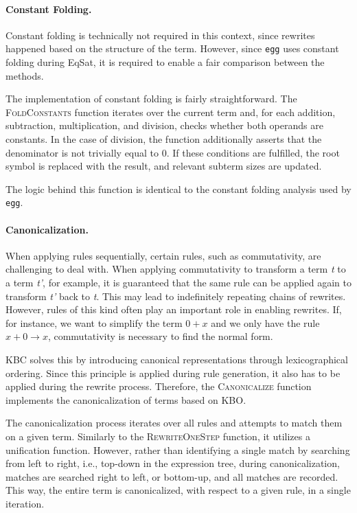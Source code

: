 \paragraph{Constant Folding.} Constant folding is technically not required in this context, since rewrites happened based on the structure of the term. However, since \texttt{egg} uses constant folding during EqSat, it is required to enable a fair comparison between the methods. 

The implementation of constant folding is fairly straightforward. The \textsc{FoldConstants} function iterates over the current term and, for each addition, subtraction, multiplication, and division, checks whether both operands are constants. In the case of division, the function additionally asserts that the denominator is not trivially equal to 0. If these conditions are fulfilled, the root symbol is replaced with the result, and relevant subterm sizes are updated.

The logic behind this function is identical to the constant folding analysis used by \texttt{egg}.

\paragraph{Canonicalization.} When applying rules sequentially, certain rules, such as commutativity, are challenging to deal with. When applying commutativity to transform a term \emph{t} to a term \emph{t'}, for example, it is guaranteed that the same rule can be applied again to transform \emph{t'} back to \emph{t}. This may lead to indefinitely repeating chains of rewrites. However, rules of this kind often play an important role in enabling rewrites. If, for instance, we want to simplify the term $0+x$ and we only have the rule $x+0 \to x$, commutativity is necessary to find the normal form.

KBC solves this by introducing canonical representations through lexicographical ordering. Since this principle is applied during rule generation, it also has to be applied during the rewrite process. Therefore, the \textsc{Canonicalize} function implements the canonicalization of terms based on KBO. 

The canonicalization process iterates over all rules and attempts to match them on a given term. Similarly to the \textsc{RewriteOneStep} function, it utilizes a unification function. However, rather than identifying a single match by searching from left to right, i.e., top-down in the expression tree, during canonicalization, matches are searched right to left, or bottom-up, and all matches are recorded. This way, the entire term is canonicalized, with respect to a given rule, in a single iteration.

